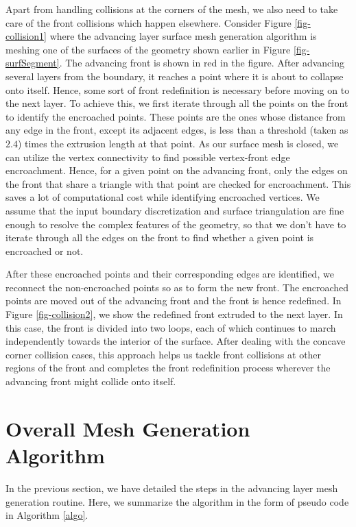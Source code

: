 Apart from handling collisions at the corners of the mesh, we also need to take care of the front collisions which happen elsewhere. Consider Figure \ref{fig-collision1} where the advancing layer surface mesh generation algorithm is meshing one of the surfaces of the geometry shown earlier in Figure \ref{fig-surfSegment}. The advancing front is shown in red in the figure. After advancing several layers from the boundary, it reaches a point where it is about to collapse onto itself. Hence, some sort of front redefinition is necessary before moving on to the next layer. To achieve this, we first iterate through all the points on the front to identify the encroached points. These points are the ones whose distance from any edge in the front, except its adjacent edges, is less than a threshold (taken as $2.4$) times the extrusion length at that point. As our surface mesh is closed, we can utilize the vertex connectivity to find possible vertex-front edge encroachment. Hence, for a given point on the advancing front, only the edges on the front that share a triangle with that point are checked for encroachment. This saves a lot of computational cost while identifying encroached vertices. We assume that the input boundary discretization and surface triangulation are fine enough to resolve the complex features of the geometry, so that we don't have to iterate through all the edges on the front to find whether a given point is encroached or not.

After these encroached points and their corresponding edges are identified, we reconnect the non-encroached points so as to form the new front. The encroached points are moved out of the advancing front and the front is hence redefined. In Figure \ref{fig-collision2}, we show the redefined front extruded to the next layer. In this case, the front is divided into two loops, each of which continues to march independently towards the interior of the surface. After dealing with the concave corner collision cases, this approach helps us tackle front collisions at other regions of the front  and completes the front redefinition process wherever the advancing front might collide onto itself.

\section{Overall Mesh Generation Algorithm}
In the previous section, we have detailed the steps in the advancing layer mesh generation routine. Here, we summarize the algorithm in the form of pseudo code in Algorithm \ref{algo}.


